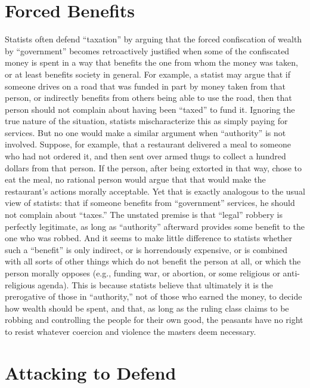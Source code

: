 \documentclass{book}
\begin{document}
\section{Forced Benefits}

Statists often defend \enquote{taxation} by arguing that the forced confiscation of wealth by \enquote{government} becomes retroactively justified when some of the confiscated money is spent in a way that benefits the one from whom the money was taken, or at least benefits society in general. For example, a statist may argue that if someone drives on a road that was funded in part by money taken from that person, or indirectly benefits from others being able to use the road, then that person should not complain about having been \enquote{taxed} to fund it. Ignoring the true nature of the situation, statists mischaracterize this as simply paying for services. But no one would make a similar argument when \enquote{authority} is not involved. Suppose, for example, that a restaurant delivered a meal to someone who had not ordered it, and then sent over armed thugs to collect a hundred dollars from that person. If the person, after being extorted in that way, chose to eat the meal, no rational person would argue that that would make the restaurant's actions morally acceptable. Yet that is exactly analogous to the usual view of statists: that if someone benefits from \enquote{government} services, he should not complain about \enquote{taxes.} The unstated premise is that \enquote{legal} robbery is perfectly legitimate, as long as \enquote{authority} afterward provides some benefit to the one who was robbed. And it seems to make little difference to statists whether such a \enquote{benefit} is only indirect, or is horrendously expensive, or is combined with all sorts of other things which do not benefit the person at all, or which the person morally opposes (e.g., funding war, or abortion, or some religious or anti-religious agenda). This is because statists believe that ultimately it is the prerogative of those in \enquote{authority,} not of those who earned the money, to decide how wealth should be spent, and that, as long as the ruling class claims to be robbing and controlling the people for their own good, the peasants have no right to resist whatever coercion and violence the masters deem necessary.

\section{Attacking to Defend}
\end{document}
